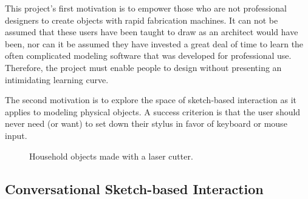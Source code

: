 \documentclass[11pt]{article}
\begin{document}
This project's first motivation is to empower those who are not
professional designers to create objects with rapid fabrication
machines. It can not be assumed that these users have been taught to
draw as an architect would have been, nor can it be assumed they have
invested a great deal of time to learn the often complicated modeling
software that was developed for professional use. Therefore, the
project must enable people to design without presenting an
intimidating learning curve.

The second motivation is to explore the space of sketch-based
interaction as it applies to modeling physical objects. A success
criterion is that the user should never need (or want) to set down
their stylus in favor of keyboard or mouse input.

\begin{figure}
\centering 
{}
\hspace{1cm} 
\caption{Household objects made with a laser cutter.}
\label{fig:flat}
\end{figure}

\subsection{Conversational Sketch-based Interaction}
\end{document}
